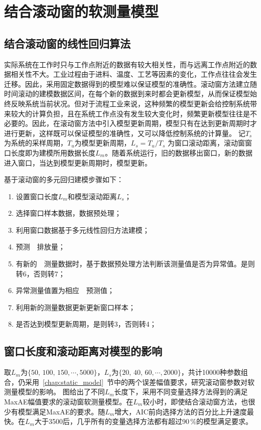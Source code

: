 \section{结合滚动窗的软测量模型}
\subsection{结合滚动窗的线性回归算法}

实际系统在工作时只与工作点附近的数据有较大相关性，而与远离工作点附近的数据相关性不大。工业过程由于进料、温度、工艺等因素的变化，工作点往往会发生迁移。因此，采用固定数据得到的模型难以保证模型的准确性。滚动窗方法建立随时间滚动的建模数据区间，在每个新的数据到来时都会更新模型，从而保证模型始终反映系统当前状况。但对于流程工业来说，这种频繁的模型更新会给控制系统带来较大的计算负担，且在系统工作点没有发生较大变化时，频繁更新模型往往是不必要的。因此，在滚动窗方法中引入模型更新周期，模型只有在达到更新周期时才进行更新，这样既可以保证模型的准确性，又可以降低控制系统的计算量。
记$T_{s}$为系统的采样周期，$T_{u}$为模型更新周期，$L_{s} = T_{u}/T_{s}$ 为窗口滚动距离，滚动窗窗口长度即为建模所用数据长度$L_{m}$。随着系统运行，旧的数据移出窗口，新的数据进入窗口，当达到模型更新周期时，模型更新。

基于滚动窗的多元回归建模步骤如下：
\begin{enumerate}
\item {设置窗口长度$L_{m}$和模型滚动距离$L_{s}$；} 
\item {选择窗口样本数据，数据预处理；}
\item {利用窗口数据基于多元线性回归方法建模；}
\item{预测~~排放量；}
\item{有新的~~测量数据时，基于数据预处理方法判断该测量值是否为异常值。是则转6，否则转7；}
\item{异常测量值置为相应~~预测值；}
\item{利用新的测量数据更新更新窗口样本；}
\item {是否达到模型更新周期，是则转3，否则转4；}
\end{enumerate}

\subsection{窗口长度和滚动距离对模型的影响}

取$L_{m}$为$\{\textrm{50},\,\textrm{100},\,\textrm{150},\cdots,\textrm{5000}\}$，$L_{s}$为$\{\textrm{20},\,\textrm{40},\,\textrm{60},\cdots,\textrm{2000}\}$，共计10000种参数组合，仍采用~\ref{chap:static_model}~节中的两个误差幅值要求，研究滚动窗参数对软测量模型的影响。
图给出了不同$L_{m}$长度下，采用不同变量选择方法得到的满足MaxAE幅值要求的滚动窗软测量模型。在$L_{m}$较小时，即使结合滚动窗方法，也很少有模型满足MaxAE的要求。随$L_{m}$增大，AIC前向选择方法的百分比上升速度最快。在$L_{m}$大于3500后，几乎所有的变量选择方法都有超过90$\,\%$的模型满足要求。

